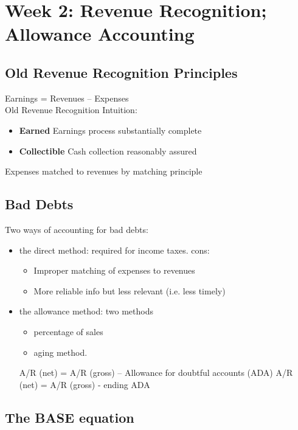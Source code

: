 \section*{Week 2: Revenue Recognition; Allowance Accounting}

\subsection*{Old Revenue Recognition Principles}
Earnings = Revenues – Expenses \\
Old Revenue Recognition Intuition:
\begin{itemize}
	\item \textbf{Earned} Earnings process substantially complete
	\item \textbf{Collectible} Cash collection reasonably assured
\end{itemize}
Expenses matched to revenues by matching principle


\subsection*{Bad Debts}

Two ways of accounting for bad debts:
\begin{itemize}[noitemsep,topsep=0pt]
	\item the direct method: required for income taxes. cons: 
	\begin{itemize}[noitemsep,topsep=0pt]
		\item Improper matching of expenses to revenues
		\item More reliable info but less relevant (i.e. less timely)
	\end{itemize}
	\item the allowance method: two methods
	\begin{itemize}[noitemsep,topsep=0pt]
		\item percentage of sales
		\item aging method.
	\end{itemize}

A/R (net) = A/R (gross) – Allowance for doubtful accounts (ADA)
A/R (net) = A/R (gross) - ending ADA
	
\end{itemize}

\subsection*{The BASE equation}


